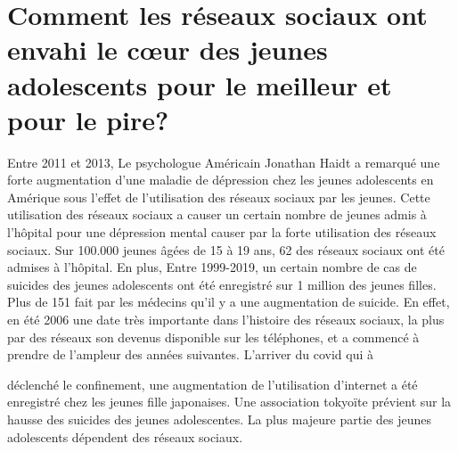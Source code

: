 \documentclass[12pt,a4paper,titlepage]{article}
\begin{document}
\section{Comment les réseaux sociaux ont envahi le cœur des jeunes
adolescents pour le meilleur et pour le pire?}
Entre 2011 et 2013, Le psychologue Américain Jonathan
Haidt a remarqué une forte augmentation d’une maladie de
dépression chez les jeunes adolescents en Amérique sous
l’effet de l’utilisation des réseaux sociaux par les jeunes. Cette
utilisation des réseaux sociaux a causer un certain nombre de
jeunes admis à l’hôpital pour une dépression mental causer
par la forte utilisation des réseaux sociaux. Sur 100.000
jeunes âgées de 15 à 19 ans, 62%
des réseaux sociaux ont été admises à l’hôpital. En plus, Entre
1999-2019, un certain nombre de cas de suicides des jeunes
adolescents ont été enregistré sur 1 million des jeunes filles.
Plus de 151%
fait par les médecins qu’il y a une augmentation de suicide.
En effet, en été 2006 une date très importante dans l’histoire
des réseaux sociaux, la plus par des réseaux son devenus
disponible sur les téléphones, et a commencé à prendre de
l’ampleur des années suivantes. L’arriver du covid qui à

déclenché le confinement, une augmentation de l’utilisation
d’internet a été enregistré chez les jeunes fille japonaises.
Une association tokyoïte prévient sur la hausse des suicides
des jeunes adolescentes. La plus majeure partie des jeunes
adolescents dépendent des réseaux sociaux. 
\end{document}
